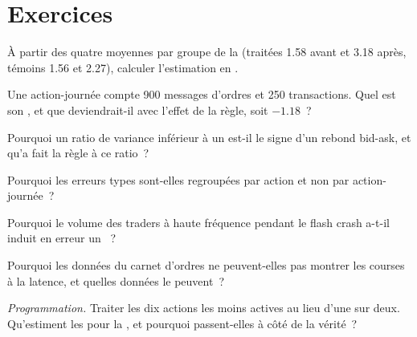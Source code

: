 \section{Exercices}

\begin{exercise}[$\star$]\label{exo:mx:market-quality-and-regulation:1}
À partir des quatre moyennes par groupe de la  (traitées 1.58 avant et 3.18 après, témoins 1.56 et 2.27), calculer l'estimation en .
\end{exercise}

\begin{exercise}[$\star$]\label{exo:mx:market-quality-and-regulation:2}
Une action-journée compte 900 messages d'ordres et 250 transactions. Quel est son , et que deviendrait-il avec l'effet de la règle, soit $-1.18$~?
\end{exercise}

\begin{exercise}[$\star$]\label{exo:mx:market-quality-and-regulation:3}
Pourquoi un ratio de variance inférieur à un est-il le signe d'un rebond bid-ask, et qu'a fait la règle à ce ratio~?
\end{exercise}

\begin{exercise}[$\star\star$]\label{exo:mx:market-quality-and-regulation:4}
Pourquoi les erreurs types sont-elles regroupées par action et non par action-journée~?
\end{exercise}

\begin{exercise}[$\star\star$]\label{exo:mx:market-quality-and-regulation:5}
Pourquoi le volume des traders à haute fréquence pendant le flash crash a-t-il induit en erreur un ~?
\end{exercise}

\begin{exercise}[$\star\star$]\label{exo:mx:market-quality-and-regulation:6}
Pourquoi les données du carnet d'ordres ne peuvent-elles pas montrer les courses à la latence, et quelles données le peuvent~?
\end{exercise}

\begin{exercise}[$\star\star\star$]\label{exo:mx:market-quality-and-regulation:7}
\emph{Programmation.} Traiter les dix actions les moins actives au lieu d'une sur deux. Qu'estiment les  pour la , et
pourquoi passent-elles à côté de la vérité~?
\end{exercise}

